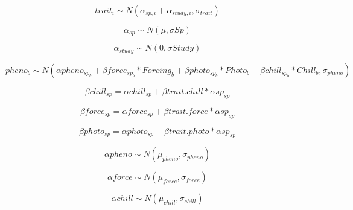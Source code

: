 \documentclass{article}\usepackage[]{graphicx}\usepackage[]{color}
\begin{document}

\begin{equation}
\label{TraitsLine_main}
trait_{i} \sim N( \alpha_{sp,i} + \alpha_{study,i},\sigma_{trait}) 
\end{equation}

\begin{equation}
\label{TraitsLine_sp}
\alpha_{sp} \sim N(\mu, \sigma Sp)
\end{equation}

\begin{equation}
\label{TraitsLine_study}
\alpha_{study} \sim N(0, \sigma Study)
\end{equation} 

\begin{equation}
\label{phen_main}
pheno_{b}  \sim N( \alpha pheno_{sp_b} + \beta force_{sp_b} * Forcing_{b} + \beta photo_{sp_b}  * Photo_{b} + \beta chill_{sp_b} * Chill_{b} , \sigma_{pheno} ) 
\end{equation} 

\begin{equation}
\label{betaChillEq}
\beta chill_{sp} = \alpha chill_{sp} + \beta trait.chill * \alpha sp_{sp}
\end{equation} 

\begin{equation}
\label{betaForceEq}
\beta force_{sp} = \alpha force_{sp} + \beta trait.force * \alpha sp_{sp}
\end{equation} 

\begin{equation}
\label{betaPhotoEq}
\beta photo_{sp} = \alpha photo_{sp} + \beta trait.photo * \alpha sp_{sp}
\end{equation}

\begin{equation}
\label{alphaPheneq}
\alpha pheno  \sim N(\mu_{pheno}, \sigma_{pheno}) 
\end{equation}

\begin{equation}
\label{alphaForceq}
\alpha force \sim N(\mu_{force}, \sigma_{force}) 
\end{equation}

\begin{equation}
\label{alphachilleq}
\alpha chill  \sim N(\mu_{chill}, \sigma_{chill})
\end{equation}
\end{document}
